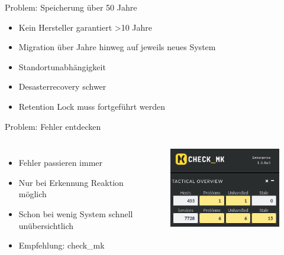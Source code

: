 \documentclass[10pt]{beamer}
\begin{document}
%
%
\begin{frame}[fragile]{Problem: Speicherung über 50 Jahre}
	\begin{itemize}
	\item Kein Hersteller garantiert \textgreater 10 Jahre
	\item Migration über Jahre hinweg auf jeweils neues System
	\item Standortunabhängigkeit
	\item Desasterrecovery schwer
	\item Retention Lock muss fortgeführt werden
\end{itemize}
\end{frame}

%
%
\begin{frame}[fragile]{Problem: Fehler entdecken}

\begin{columns}[T,c,onlytextwidth]
	\begin{itemize}
	\item Fehler passieren immer
	\item Nur bei Erkennung Reaktion möglich
	\item Schon bei wenig System schnell unübersichtlich
	\item Empfehlung: check\_mk
\end{itemize}
	\begin{figure}
		\includegraphics[width=1\textwidth]{images/omd}
	\end{figure}
\end{columns}
\end{frame}
\end{document}

